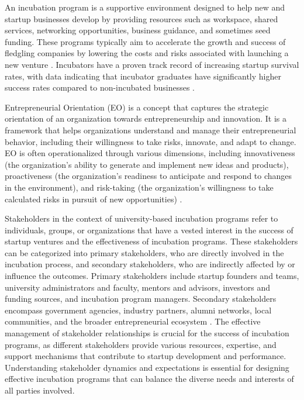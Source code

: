 \documentclass[../Main.tex]{subfiles}
\begin{document}
An incubation program is a supportive environment designed to help new and startup businesses develop by providing resources such as workspace, shared services, networking opportunities, business guidance, and sometimes seed funding. These programs typically aim to accelerate the growth and success of fledgling companies by lowering the costs and risks associated with launching a new venture \autocite{hackett2004business,europeancommission2014incubators}. Incubators have a proven track record of increasing startup survival rates, with data indicating that incubator graduates have significantly higher success rates compared to non-incubated businesses \autocite{NBIA2012}.

Entrepreneurial Orientation (EO) is a concept that captures the strategic orientation of an organization towards entrepreneurship and innovation. It is a framework that helps organizations understand and manage their entrepreneurial behavior, including their willingness to take risks, innovate, and adapt to change. EO is often operationalized through various dimensions, including innovativeness (the organization's ability to generate and implement new ideas and products), proactiveness (the organization's readiness to anticipate and respond to changes in the environment), and risk-taking (the organization's willingness to take calculated risks in pursuit of new opportunities) \autocite{wiklund2005entrepreneurial}.

Stakeholders in the context of university-based incubation programs refer to individuals, groups, or organizations that have a vested interest in the success of startup ventures and the effectiveness of incubation programs. These stakeholders can be categorized into primary stakeholders, who are directly involved in the incubation process, and secondary stakeholders, who are indirectly affected by or influence the outcomes. Primary stakeholders include startup founders and teams, university administrators and faculty, mentors and advisors, investors and funding sources, and incubation program managers. Secondary stakeholders encompass government agencies, industry partners, alumni networks, local communities, and the broader entrepreneurial ecosystem \autocite{miller1983correlates, bandura1997self}. The effective management of stakeholder relationships is crucial for the success of incubation programs, as different stakeholders provide various resources, expertise, and support mechanisms that contribute to startup development and performance. Understanding stakeholder dynamics and expectations is essential for designing effective incubation programs that can balance the diverse needs and interests of all parties involved.
\end{document}

